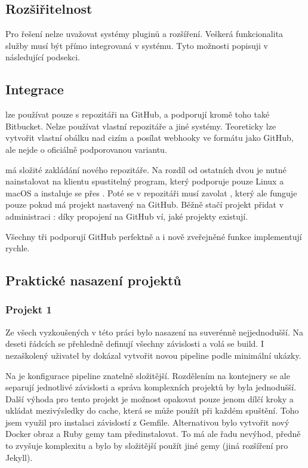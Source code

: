     \subsection{Rozšiřitelnost}
        Pro  řešení nelze uvažovat systémy pluginů a rozšíření. Veškerá funkcionalita služby musí být přímo integrovaná v systému. Tyto možnosti popisuji v následující podsekci.

    \subsection{Integrace}
        \travis lze používat pouze s repozitáři na GitHub, \circleci a \semaphore podporují kromě toho také Bitbucket. Nelze používat vlastní repozitáře a jiné systémy. Teoreticky lze vytvořit vlastní obálku nad cizím  a posílat webhooky ve formátu jako GitHub, ale nejde o oficiálně podporovanou variantu.

        \semaphore má složité zakládání nového repozitáře. Na rozdíl od ostatních dvou \CI je nutné nainstalovat na klientu spustitelný program, který podporuje pouze Linux a macOS a instaluje se přes . Poté se v repozitáři musí zavolat , který ale funguje pouze pokud má projekt nastavený  na GitHub. Běžně stačí projekt přidat v administraci \CI: díky propojení na GitHub \CI ví, jaké projekty existují.

        Všechny tři \CI podporují GitHub perfektně a i nově zveřejněné funkce implementují rychle.

    \subsection{Praktické nasazení projektů}
        \subsubsection{Projekt 1}
            Ze všech \CI vyzkoušených v této práci bylo nasazení na \travis suverénně nejjednodušší. Na deseti řádcích se přehledně definují všechny závislosti a volá se build. I nezaškolený uživatel by dokázal vytvořit novou pipeline podle minimální ukázky.

            Na \circleci je konfigurace pipeline znatelně složitější. Rozdělením na kontejnery se ale separují jednotlivé závislosti a správa komplexních projektů by byla jednodušší. Další výhoda \circleci pro tento projekt je možnost opakovat pouze jenom dílčí kroky a ukládat mezivýsledky do cache, která se může použít při každém spuštění. Toho jsem využil pro instalaci závislostí z Gemfile. Alternativou bylo vytvořit nový Docker obraz a Ruby gemy tam předinstalovat. To má ale řadu nevýhod, předně to zvyšuje komplexitu a bylo by složitější použít jiné gemy (jiná rozšíření pro Jekyll).

